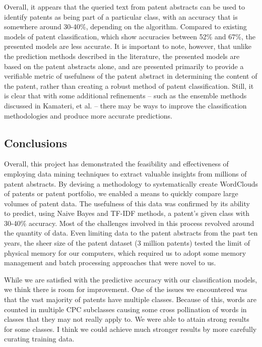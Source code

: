 \documentclass{article}
\begin{document}
Overall, it appears that the queried text from patent abstracts can be used to identify patents as being part of a particular class, with an accuracy that is somewhere around 30-40\%, depending on the algorithm.  Compared to existing models of patent classification, which show accuracies between 52\% and 67\%\cite{article:kamateri}, the presented models are less accurate.  It is important to note, however, that unlike the prediction methods described in the literature, the presented models are based on the patent abstracts alone, and are presented primarily to provide a verifiable metric of usefulness of the patent abstract in determining the content of the patent, rather than creating a robust method of patent classification.  Still, it is clear that with some additional refinements – such as the ensemble methods discussed in Kamateri, et al. – there may be ways to improve the classification methodologies and produce more accurate predictions.

\subsection{Conclusions}
Overall, this project has demonstrated the feasibility and effectiveness of employing data mining techniques to extract valuable insights from millions of patent abstracts.  By devising a methodology to systematically create WordClouds of patents or patent portfolio, we enabled a means to quickly compare large volumes of patent data.  The usefulness of this data was confirmed by its ability to predict, using Naive Bayes and TF-IDF methods, a patent’s given class with 30-40\% accuracy. Most of the challenges involved in this process revolved around the quantity of data.  Even limiting data to the patent abstracts from the past ten years, the sheer size of the patent dataset (3 million patents) tested the limit of physical memory for our computers, which required us to adopt some memory management and batch processing approaches that were novel to us.  

While we are satisfied with the predictive accuracy with our classification models, we think there is room for improvement. One of the issues we encountered was that the vast majority of patents have multiple classes.  Because of this, words are counted in multiple CPC subclasses causing some cross pollination of words in classes that they may not really apply to. We were able to attain strong results for some classes. I think we could achieve much stronger results by more carefully curating training data. 




 




\end{document}
